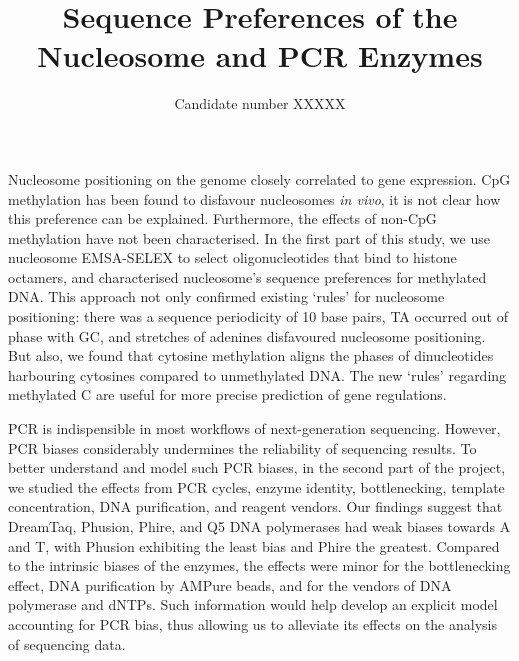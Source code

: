 \documentclass[parskip=full, numbers=noenddot]{scrbook}
\title{Sequence Preferences of the Nucleosome and PCR Enzymes}
\author{Candidate number XXXXX}
\newenvironment{abstract}%
{\cleardoublepage\null \vfill\begin{center}%
    \bfseries \abstractname \end{center}}%
    {\vfill \null}
\begin{document}

\frontmatter

\maketitle

\begin{abstract}
  
  Nucleosome positioning on the genome closely correlated to gene expression.  CpG methylation has been found to disfavour nucleosomes \emph{in vivo}, it is not clear how this preference can be explained.  Furthermore, the effects of non-CpG methylation have not been characterised.  In the first part of this study, we use  nucleosome EMSA-SELEX to select oligonucleotides that bind to histone octamers, and characterised nucleosome's sequence preferences for methylated DNA.  This approach not only confirmed existing `rules' for nucleosome positioning: there was a sequence periodicity of 10 base pairs, TA occurred out of phase with GC, and stretches of adenines disfavoured nucleosome positioning.  But also, we found that cytosine methylation aligns the phases of dinucleotides harbouring cytosines compared to unmethylated DNA.  %
  The new ‘rules’ regarding methylated C are useful for more precise prediction of gene regulations.

PCR is indispensible in most workflows of next-generation sequencing. However, PCR biases considerably undermines the reliability of sequencing results.  To better understand and model such PCR biases, in the second part of the project, we studied the effects from PCR cycles, enzyme identity, bottlenecking, template concentration, DNA purification, and reagent vendors.  Our findings suggest that DreamTaq, Phusion, Phire, and Q5 DNA polymerases had weak biases towards A and T, with Phusion exhibiting the least bias and Phire the greatest.  Compared to the intrinsic biases of the enzymes, the effects were minor for the bottlenecking effect, DNA purification by AMPure beads, and for the vendors of DNA polymerase and dNTPs.  Such information would help develop an explicit model accounting for PCR bias, thus allowing us to alleviate its effects on the analysis of sequencing data.
 
\end{abstract}
\end{document}
